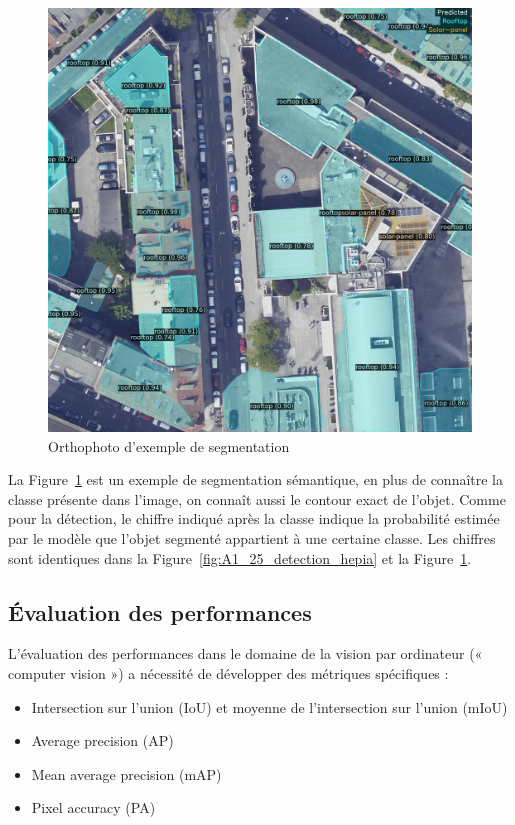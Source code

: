 \begin{figure}[H]
    \centering
    \includegraphics[width=1\linewidth]{03-tail//A1_fondamentaux_ML//A1_figures/A1_30_segmentation_semantique_hepia.png}
    \caption{Orthophoto d'exemple de segmentation}
    \label{fig:A1_30_segmentation_semantique_hepia}
\end{figure}

La Figure~\ref{fig:A1_30_segmentation_semantique_hepia} est un exemple de segmentation sémantique, en plus de connaître la classe présente dans l'image, on connaît aussi le contour exact de l'objet. Comme pour la détection, le chiffre indiqué après la classe indique la probabilité estimée par le modèle que l'objet segmenté appartient à une certaine classe. Les chiffres sont identiques dans la Figure~\ref{fig:A1_25_detection_hepia} et la Figure~\ref{fig:A1_30_segmentation_semantique_hepia}.

\subsection{Évaluation des performances}

L'évaluation des performances dans le domaine de la vision par ordinateur (« computer vision ») a nécessité de développer des métriques spécifiques :
\begin{itemize}
    \item Intersection sur l'union (IoU) et moyenne de l'intersection sur l'union (mIoU)
    \item Average precision (AP)
    \item Mean average precision (mAP)
    \item Pixel accuracy (PA)
\end{itemize}

